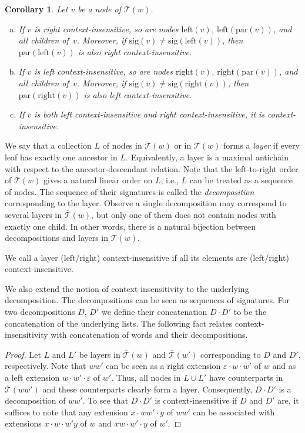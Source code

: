 \documentclass[a4paper]{article}
\newtheorem{corollary}[theorem]{Corollary}
\theoremstyle{remark}
\newcommand{\stree}{\mathcal{T}}
\newcommand{\ustree}{\mathcal{\overline{T}}}
\newcommand{\uspar}{\mathrm{par}}
\newcommand{\usleft}{\mathrm{left}}
\newcommand{\usright}{\mathrm{right}}
\newcommand{\ussig}{\mathrm{sig}}
\newcommand{\eps}{\varepsilon}
\newcommand{\edot}{{\cdot}}
\begin{document}
\begin{corollary}\label{cor:context_insensitive} Let $v$ be a node of $\ustree(w)$.
\begin{enumerate}[(a)]
\item\label{it:left} If $v$ is right context-insensitive, so are nodes $\usleft(v)$, $\usleft(\uspar(v))$, and all children of~$v$.
Moreover, if $\ussig(v)\ne \ussig(\usleft(v))$, then $\uspar(\usleft(v))$ is also right context-insensitive.
\item\label{it:right} If $v$ is left context-insensitive, so are nodes $\usright(v)$, $\usright(\uspar(v))$, and all children of~$v$.
Moreover, if $\ussig(v)\ne \ussig(\usright(v))$, then $\uspar(\usright(v))$ is also left context-insensitive.
\item\label{it:both} If $v$ is both left context-insensitive and right context-insensitive, it is context-insensitive.
\end{enumerate}
\end{corollary}


We say that a collection $L$ of nodes in $\ustree(w)$ or in $\stree(w)$ forms a \emph{layer} if every leaf has exactly one ancestor in $L$.
Equivalently, a layer is a maximal antichain with respect to the ancestor-descendant relation.
Note that the left-to-right order of $\ustree(w)$ gives a natural linear order on $L$, i.e., $L$ can be treated as a sequence of nodes.
The sequence of their signatures is called the \emph{decomposition} corresponding to the layer.
Observe a single decomposition may correspond to several layers in $\ustree(w)$, but only one of them does not contain nodes with exactly one child.
In other words, there is a natural bijection between decompositions and layers in $\stree(w)$.

We call a layer (left/right) context-insensitive if all its elements are (left/right) context-insensitive.

We also extend the notion of context insensitivity to the underlying decomposition.
The decompositions can be seen as sequences of signatures.
For two decompositions $D$, $D'$ we define their concatenation $D\cdot D'$ to be
the concatenation of the underlying lists.
The following fact relates context-insensitivity with concatenation of words and their decompositions.

\twodecompositions*


\begin{proof}
Let $L$ and $L'$ be layers in $\ustree(w)$ and $\ustree(w')$ corresponding to $D$ and $D'$, respectively.
Note that $ww'$ can be seen as a right extension $\eps \edot w \edot w'$ of $w$ and as a left extension $w\edot w' \edot \eps$ of $w'$.
Thus, all nodes in $L\cup L'$ have counterparts in $\ustree(ww')$ and these counterparts clearly form a layer.
Consequently, $D\cdot D'$ is a decomposition of $ww'$.
To see that $D\cdot D'$ is context-insensitive if $D$ and $D'$ are, it suffices to note that any extension $x \edot ww' \edot y$
of $ww'$ can be associated with extensions $x \edot w \edot w'y$ of $w$ and $xw \edot w' \edot y$ of $w'$.
\end{proof}
\end{document}
